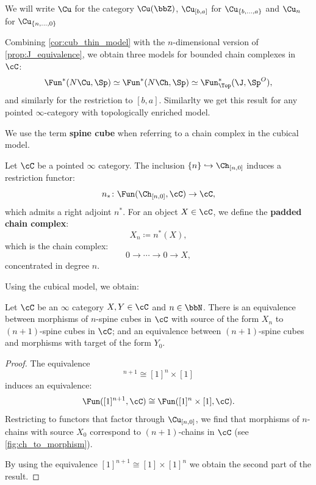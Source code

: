 We will write $\Cu$ for the category $\Cu(\bbZ)$, $\Cu_{[b,a]}$ for $\Cu_{\{b,\dots, a\}}$ and $\Cu_{n}$ for $\Cu_{\{n,\dots, 0\}}$

Combining \cref{cor:cub_thin_model} with the $n$-dimensional version of \cref{prop:J_equivalence}, we obtain three models for bounded chain complexes in $\cC$:
\begin{equation*}
    \Fun^*(N\Cu, \Sp) \simeq \Fun^*(N\Ch, \Sp) \simeq \Fun^*_{\Top}(\J, \Sp^O),
\end{equation*}
and similarly for the restriction to $[b,a]$.
Similarlty we get this result for any pointed $\infty$-category with topologically enriched model.

We use the term \textbf{spine cube} when referring to a chain complex in the cubical model.

\begin{defn}\label{def:pad_ch}
Let $\cC$ be a pointed $\infty$ category. The inclusion $\{ n \} \hookrightarrow \Ch_{[n,0]}$ induces a restriction functor:
\begin{equation*}
    n_* \colon \Fun(\Ch_{[n,0]}, \cC) \to \cC,
\end{equation*}
which admits a right adjoint $n^*$. For an object $X \in \cC$, we define the \textbf{padded chain complex}:
\begin{equation*}
    X_n \coloneqq n^*(X),
\end{equation*}
which is the chain complex:
\begin{equation*}
    0 \to \dotsb \to 0 \to X,
\end{equation*}
concentrated in degree $n$.
\end{defn}

Using the cubical model, we obtain:

\begin{cor}\label{cor:ch_to_morph}
Let $\cC$ be an $\infty$ category $X,Y \in \cC$ and $n \in \bbN$. There is an equivalence between morphisms of $n$-spine cubes in $\cC$ with source of the form $X_n$ to $(n + 1)$-spine cubes in $\cC$; and an equivalence between $(n + 1)$-spine cubes and morphisms with target of the form $Y_0$.
\end{cor}

\begin{proof}
The equivalence
\begin{equation*}
    [1]^{n + 1} \cong [1]^n \times [1]
\end{equation*}
induces an equivalence:
\begin{equation*}
    \Fun([1]^{n + 1}, \cC) \cong \Fun([1]^n \times [1], \cC).
\end{equation*}
Restricting to functors that factor through $\Cu_{[n,0]}$, we find that morphisms of $n$-chains with source $X_0$ correspond to $(n + 1)$-chains in $\cC$ (see \cref{fig:ch_to_morphism}).

By using the equivalence $[1]^{n + 1} \cong [1] \times [1]^n$ we obtain the second part of the result.
\end{proof}

